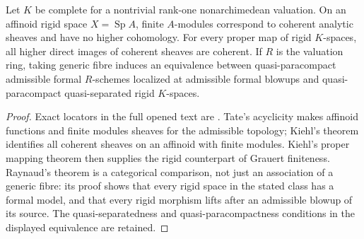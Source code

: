 \begin{theorem}\label{thm:B3-rigid}
Let $K$ be complete for a nontrivial rank-one nonarchimedean
valuation. On an affinoid rigid space $X=\operatorname{Sp}A$,
finite $A$-modules correspond to coherent analytic sheaves and
have no higher cohomology. For every proper map of rigid
$K$-spaces, all higher direct images of coherent sheaves are
coherent. If $R$ is the valuation ring, taking generic fibre
induces an equivalence between quasi-paracompact admissible
formal $R$-schemes localized at admissible formal blowups and
quasi-paracompact quasi-separated rigid $K$-spaces.
\end{theorem}
\begin{proof}
Exact locators in the full opened text are
\cite[Section 4.3, Theorem 10 and Corollary 11, pp.~90--91;
Section 6.1, Theorem 4, p.~119;
Section 6.3, Theorem 9, p.~132;
Section 8.4, Theorem 3, p.~204]{BBosch2014}.
Tate's acyclicity makes affinoid functions and finite modules
sheaves for the admissible topology; Kiehl's theorem identifies
all coherent sheaves on an affinoid with finite modules.
Kiehl's proper mapping theorem then supplies the rigid counterpart
of Grauert finiteness. Raynaud's theorem is a categorical
comparison, not just an association of a generic fibre: its proof
shows that every rigid space in the stated class has a formal
model, and that every rigid morphism lifts after an admissible
blowup of its source. The quasi-separatedness and
quasi-paracompactness conditions in the displayed equivalence
are retained.
\end{proof}

